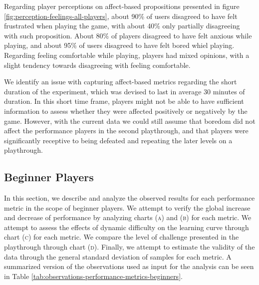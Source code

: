 Regarding player perceptions on affect-based propositions presented in figure \ref{fig:perception-feelings-all-players}, about 90\% of users disagreed to have felt frustrated when playing the game, with about 40\% only partially disagreeing with such proposition. About 80\% of players disagreed to have felt anxious while playing, and about 95\% of users disagreed to have felt bored whiel playing. Regarding feeling comfortable while playing, players had mixed opinions, with a slight tendency towards disagreeing with feeling comfortable.

We identify an issue with capturing affect-based metrics regarding the short duration of the experiment, which was devised to last in average 30 minutes of duration. In this short time frame, players might not be able to have sufficient information to assess whether they were affected positively or negatively by the game. However, with the current data we could still assume that boredom did not affect the performance players in the second playthrough, and that players were significantly receptive to being defeated and repeating the later levels on a playthrough.


\subsection{Beginner Players}

In this section, we describe and analyze the observed results for each performance metric in the scope of beginner players. We attempt to verify the global increase and decrease of performance by analyzing charts \textsc{(a)} and \textsc{(b)} for each metric. We attempt to assess the effects of dynamic difficulty on the learning curve through chart \textsc{(c)} for each metric. We compare the level of challenge presented in the  playthrough through chart \textsc{(d)}. Finally, we attempt to estimate the validity of the data through the general standard deviation of samples for each metric. A summarized version of the observations used as input for the analysis can be seen in Table \ref{tab:observations-performance-metrics-beginners}.

